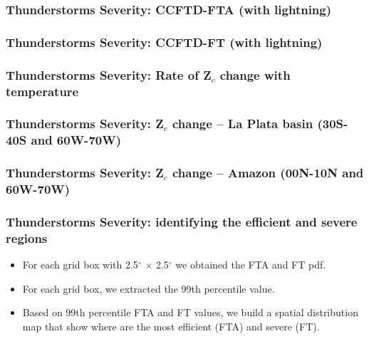 \documentclass[smaller]{beamer}
\begin{document}
\begin{frame}
\frametitle{Thunderstorms Severity: CCFTD-FTA (with lightning)}

\end{frame}
\begin{frame}
\frametitle{Thunderstorms Severity: CCFTD-FT (with lightning)}

\end{frame}


\begin{frame}
\frametitle{Thunderstorms Severity: Rate of Z$_c$ change with temperature}

\end{frame}

\begin{frame}
\frametitle{Thunderstorms Severity: Z$_c$ change -- La Plata basin (30S-40S and 60W-70W)}

\end{frame}

\begin{frame}
\frametitle{Thunderstorms Severity: Z$_c$ change -- Amazon (00N-10N and 60W-70W)}

\end{frame}


\begin{frame}
\frametitle{Thunderstorms Severity: identifying the efficient and severe regions}
\begin{itemize}
\item For each grid box with 2.5$^{\circ}$ $\times$ 2.5$^{\circ}$ we obtained the FTA and FT pdf.
\item For each grid box, we extracted the 99th percentile value. 
\item Based on 99th percentile FTA and FT values, we build a spatial distribution map that show where are the most efficient (FTA) and severe (FT).
\end{itemize}

\end{frame}
\end{document}
